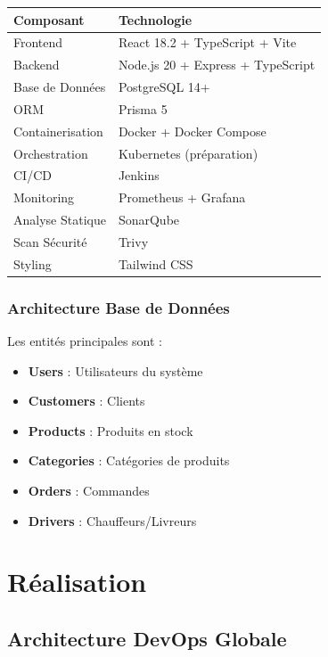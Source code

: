 \documentclass[12pt,a4paper]{report}
\begin{document}
\begin{table}[H]
\centering
\begin{tabular}{|l|l|}
\hline
\textbf{Composant} & \textbf{Technologie} \\
\hline
Frontend & React 18.2 + TypeScript + Vite \\
Backend & Node.js 20 + Express + TypeScript \\
Base de Données & PostgreSQL 14+ \\
ORM & Prisma 5 \\
Containerisation & Docker + Docker Compose \\
Orchestration & Kubernetes (préparation) \\
CI/CD & Jenkins \\
Monitoring & Prometheus + Grafana \\
Analyse Statique & SonarQube \\
Scan Sécurité & Trivy \\
Styling & Tailwind CSS \\
\hline
\end{tabular}
\end{table}

\subsection{Architecture Base de Données}

Les entités principales sont :
\begin{itemize}
    \item \textbf{Users} : Utilisateurs du système
    \item \textbf{Customers} : Clients
    \item \textbf{Products} : Produits en stock
    \item \textbf{Categories} : Catégories de produits
    \item \textbf{Orders} : Commandes
    \item \textbf{Drivers} : Chauffeurs/Livreurs
\end{itemize}

\newpage

\chapter{Réalisation}

\section{Architecture DevOps Globale}
\end{document}
